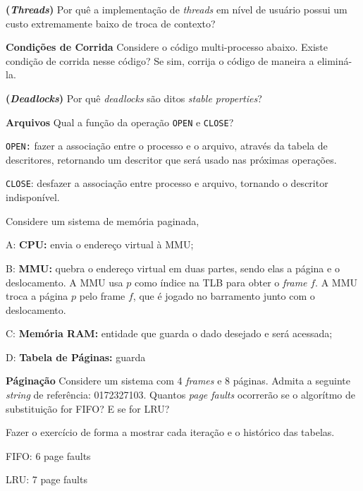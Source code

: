 \textbf{(\textit{Threads})} Por quê a implementação de \textit{threads} em nível de usuário possui um custo extremamente baixo de troca de contexto?


\textbf{Condições de Corrida} Considere o código multi-processo abaixo. Existe condição de corrida nesse código? Se sim, corrija o código de maneira a eliminá-la.


\textbf{(\textit{Deadlocks})} Por quê \textit{deadlocks} são ditos \textit{stable properties}?


\textbf{Arquivos} Qual a função da operação \texttt{OPEN} e \texttt{CLOSE}?

\texttt{OPEN:} fazer a associação entre o processo e o arquivo, através da tabela de descritores, retornando um descritor que será usado nas próximas operações.

\texttt{CLOSE}: desfazer a associação entre processo e arquivo, tornando o descritor indisponível.

\textbf{} Considere um sistema de memória paginada,

A: \textbf{CPU:} envia o endereço virtual à MMU;

B: \textbf{MMU:} quebra o endereço virtual em duas partes, sendo elas a página e o deslocamento. A MMU usa $p$ como índice na TLB para obter o \textit{frame} $f$. A MMU troca a página $p$ pelo frame $f$, que é jogado no barramento junto com o deslocamento.

C: \textbf{Memória RAM:} entidade que guarda o dado desejado e será acessada;

D: \textbf{Tabela de Páginas:} guarda


\textbf{Páginação} Considere um sistema com 4 \textit{frames} e 8 páginas. Admita a seguinte \textit{string} de referência: 0172327103. Quantos \textit{page faults} ocorrerão se o algorítmo de substituição for FIFO? E se for LRU?

Fazer o exercício de forma a mostrar cada iteração e o histórico das tabelas.

FIFO: 6 page faults

LRU: 7 page faults
